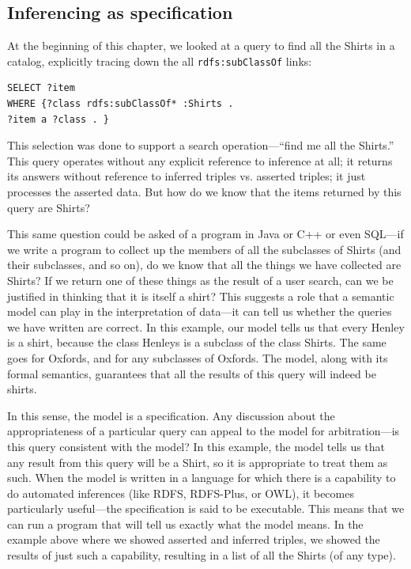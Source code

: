\subsection{Inferencing as specification}

At the beginning of this chapter, we looked at a query to find all the
Shirts in a catalog, explicitly tracing down the all \texttt{rdfs:subClassOf}
links:

\begin{lstlisting}
SELECT ?item
WHERE {?class rdfs:subClassOf* :Shirts .
?item a ?class . }
\end{lstlisting}

This selection was done to support a search operation---``find me all
the Shirts.'' This query operates without any explicit reference to
inference at all; it returns its answers without reference to inferred
triples vs. asserted triples; it just processes the asserted data. But
how do we know that the items returned by this query are Shirts?

This same question could be asked of a program in Java or C++ or even
SQL---if we write a program to collect up the members of all the
subclasses of Shirts (and their subclasses, and so on), do we know that
all the things we have collected are Shirts? If we return one of these
things as the result of a user search, can we be justified in thinking
that it is itself a shirt? This suggests a role that a semantic model
can play in the interpretation of data---it can tell us whether the
queries we have written are correct. In this example, our model tells us
that every Henley is a shirt, because the class Henleys is a subclass of
the class Shirts. The same goes for Oxfords, and for any subclasses of
Oxfords. The model, along with its formal semantics, guarantees that all
the results of this query will indeed be shirts.

In this sense, the model is a specification. Any discussion about the
appropriateness of a particular query can appeal to the model for
arbitration---is this query consistent with the model? In this example,
the model tells us that any result from this query will be a Shirt, so
it is appropriate to treat them as such. When the model is written in a
language for which there is a capability to do automated inferences
(like RDFS, RDFS-Plus, or OWL), it becomes particularly useful---the
specification is said to be executable. This means that we can run a
program that will tell us exactly what the model means. In the example
above where we showed asserted and inferred triples, we showed the
results of just such a capability, resulting in a list of all the Shirts
(of any type).

